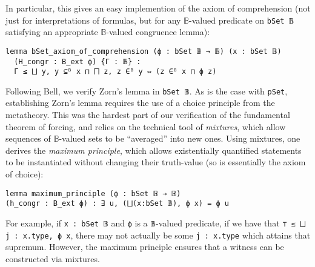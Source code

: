 \documentclass[sigplan,10pt,review]{acmart}
\newcommand{\B}{\mathbb{B}}
\newcommand{\lil}{\lstinline}
\theoremstyle{definition}
\begin{document}
In particular, this gives an easy implemention of the axiom of comprehension (not just for interpretations of formulas, but for any \(\mathbb{B}\)-valued predicate on \lil{bSet 𝔹} satisfying an appropriate \(\mathbb{B}\)-valued congruence lemma): \label{def:comprehension} %
\begin{lstlisting}
lemma bSet_axiom_of_comprehension (ϕ : bSet 𝔹 → 𝔹) (x : bSet 𝔹)
  (H_congr : B_ext ϕ) {Γ : 𝔹} :
  Γ ≤ ⨆ y, y ⊆ᴮ x ⊓ ⨅ z, z ∈ᴮ y ⇔ (z ∈ᴮ x ⊓ ϕ z)
\end{lstlisting}




Following Bell, we verify Zorn's lemma in \lil{bSet 𝔹}.
As is the case with \lil{pSet}, establishing Zorn's lemma requires the use of a choice principle from the metatheory.
This was the hardest part of our verification of the fundamental theorem of forcing, and relies on the technical tool of \emph{mixtures}, which allow sequences of $\B$-valued sets to be ``averaged'' into new ones. Using mixtures, one derives the \emph{maximum principle}, which allows existentially quantified statements to be instantiated without changing their truth-value (so is essentially the axiom of choice):
\begin{lstlisting}
lemma maximum_principle (ϕ : bSet 𝔹 → 𝔹)
(h_congr : B_ext ϕ) : ∃ u, (⨆(x:bSet 𝔹), ϕ x) = ϕ u
\end{lstlisting}
For example, if \lil{x : bSet 𝔹} and \lil{ϕ} is a \lil{𝔹}-valued predicate, if we have that \lil{⊤ ≤ ⨆ j : x.type, ϕ x}, there may not actually be some \lil{j : x.type} which attains that supremum. However, the maximum principle ensures that a witness can be constructed via mixtures.

\end{document}
